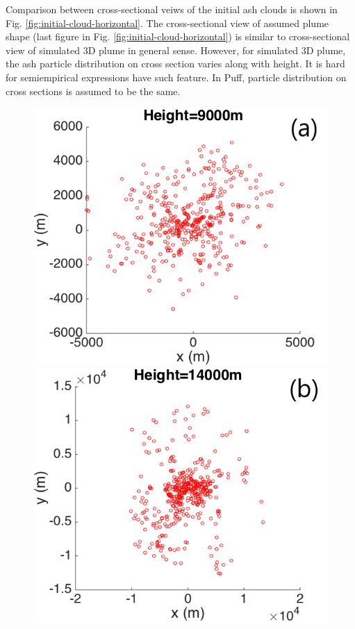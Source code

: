 \documentclass[draft,linenumbers]{agujournal2019}
\begin{document}
Comparison between cross-sectional veiws of the initial ash clouds is shown in Fig. \ref{fig:initial-cloud-horizontal}. The cross-sectional view of assumed plume shape (last figure in Fig. \ref{fig:initial-cloud-horizontal}) is similar to cross-sectional view of simulated 3D plume in general sense. However, for simulated 3D plume, the ash particle distribution on cross section varies along with height. It is hard for semiempirical expressions have such feature. In Puff, particle distribution on cross sections is assumed to be the same. 

\begin{figure}[!htb]
\centering
    \begin{minipage}{.325 \textwidth}
        \centering
        \includegraphics[width=0.99 \textwidth]{Figures/Possion-H9km-ParticleDis-h}
    \end{minipage}%
    \begin{minipage}{.325 \textwidth}
        \centering
        \includegraphics[width=0.99 \textwidth]{Figures/Possion-H14km-ParticleDis-h}

\end{minipage}
\end{figure}
\end{document}
